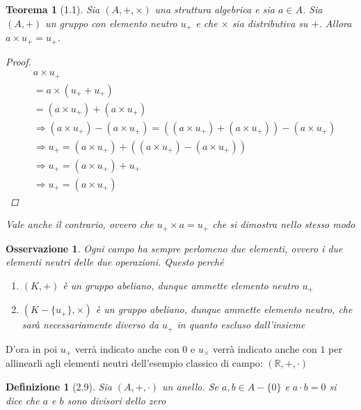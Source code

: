 \documentclass[11pt,a4paper]{article}
\theoremstyle{manuale}
\newtheorem*{definizione}{Definizione}
\newtheorem*{osservazione}{Osservazione}
\theoremstyle{manualecorsivo}
\newtheorem*{teorema}{Teorema}
\begin{document}
	\begin{teorema}[1.1]
		Sia $(A, +, \times)$ una struttura algebrica e sia $a \in A$. Sia $(A, +)$ un gruppo con elemento neutro $u_{+}$ e che $\times$ sia distributiva su $+$. Allora $a \times u_{+} = u_{+}$.
		
		\begin{proof}
			\begin{align*}
				&a \times u_{+} \\ &= a \times (u_{+} + u_{+}) \\
				&= (a \times u_{+}) + (a \times u_{+}) \\
				& \Rightarrow
				 (a \times u_{+}) - (a \times u_{+}) = ((a \times u_{+}) + (a \times u_{+})) - (a \times u_{+}) \\
				& \Rightarrow
				 u_{+} = (a \times u_{+}) + ((a \times u_{+}) - (a \times u_{+})) \\
				& \Rightarrow
				 u_{+} = (a \times u_{+}) + u_{+} \\
				& \Rightarrow
				 u_{+} = (a \times u_{+})
			\end{align*}
		\end{proof}
		
		Vale anche il contrario, ovvero che $u_{+} \times a = u_{+}$ che si dimostra nello stesso modo
		
	\end{teorema}
	
	\begin{osservazione}
		Ogni campo ha sempre perlomeno due elementi, ovvero i due elementi neutri delle due operazioni. Questo perché
		\begin{enumerate}[label=\roman*)]
			\item $(K, +)$ è un gruppo abeliano, dunque ammette elemento neutro $u_{+}$
			\item $(K - \{u_{+}\}, \times)$ è un gruppo abeliano, dunque ammette elemento neutro, che sarà necessariamente diverso da $u_{+}$ in quanto escluso dall'insieme
		\end{enumerate}
	\end{osservazione}
	
	D'ora in poi $u_{+}$ verrà indicato anche con $0$ e $u_{\times}$ verrà indicato anche con $1$ per allinearli agli elementi neutri dell'esempio classico di campo: $(\mathbb{R}, +, \cdot)$
	
	\begin{definizione}[2.9]
		Sia $(A, +, \cdot)$ un anello. Se $a,b \in A - \{0\}$ e $a \cdot b = 0$ si dice che $a$ e $b$ sono divisori dello zero
	\end{definizione}
	
\end{document}
